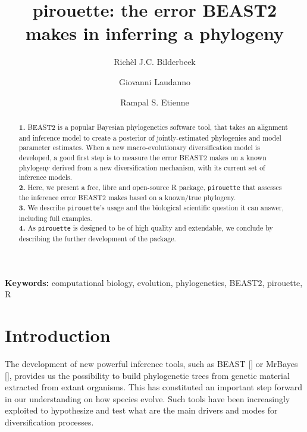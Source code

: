 \documentclass{article}
\title{pirouette: the error BEAST2 makes in inferring a phylogeny}
\author[1]{Rich\`el J.C. Bilderbeek}
\author[1]{Giovanni Laudanno}
\author[1]{Rampal S. Etienne}
\affil[1]{Groningen Institute for Evolutionary Life Sciences, University of Groningen, Groningen, The Netherlands}
\begin{document}
\maketitle

\begin{abstract}

  \textbf{1. }
    BEAST2 is a popular Bayesian phylogenetics software tool,
    that takes an alignment and inference model to create a
    posterior of jointly-estimated phylogenies and model parameter estimates.
    When a new macro-evolutionary diversification model is developed,
    a good first step is to measure the error BEAST2 makes on a known
    phylogeny derived from a new diversification mechanism, 
    with its current set of inference models. \\
  \textbf{2. }
    Here, we present a free, libre and open-source R package, \verb;pirouette;
    that assesses the inference error BEAST2 makes based on a known/true 
    phylogeny. \\
  \textbf{3. }
    We describe \verb;pirouette;'s usage and the biological scientific
    question it can answer, including full examples. \\
  \textbf{4. }
    As \verb;pirouette; is designed to be of high quality and extendable, 
    we conclude by describing the further development of the package. \\
\end{abstract}

{\bf Keywords:} computational biology, evolution, phylogenetics, BEAST2, pirouette, R





\section{Introduction}

The development of new powerful inference tools, 
such as BEAST [\cite{drummond2007beast}] or MrBayes [\cite{huelsenbeck2001mrbayes}], 
provides us the possibility to build phylogenetic trees 
from genetic material extracted from extant organisms.
This has constituted an important step forward 
in our understanding on how species 
evolve.
Such tools have been increasingly exploited to hypothesize and test what are the main drivers
and modes for diversification processes. 
\end{document}
